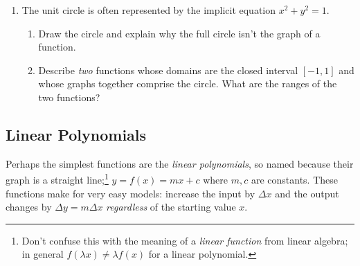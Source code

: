 \begin{exercises}{}{}
\begin{enumerate}
  \item The unit circle is often represented by the implicit equation $x^2+y^2=1$.
  \begin{enumerate}
    \item Draw the circle and explain why the full circle isn't the graph of a function.
    \item Describe \emph{two} functions whose domains are the closed interval $[-1,1]$ and whose graphs together comprise the circle. What are the ranges of the two functions?
  \end{enumerate}
  
  
\end{enumerate}
\end{exercises}


\clearpage



\subsection{Linear Polynomials}

Perhaps the simplest functions are the \emph{linear polynomials}, so named because their graph is a straight line;\footnote{Don't confuse this with the meaning of a \emph{linear function} from linear algebra; in general $f(\lambda x)\neq \lambda f(x)$ for a linear polynomial.} $y=f(x)=mx+c$ where $m,c$ are constants. These functions make for very easy models: increase the input by $\Delta x$ and the output changes by $\Delta y=m\Delta x$ \emph{regardless} of the starting value $x$. 

